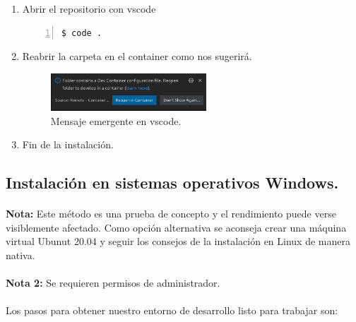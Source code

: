 \begin{enumerate}
    \item Abrir el repositorio con \gls{vscode}
    \begin{lstlisting}[style=consola, numbers=left]
        $ code .
    \end{lstlisting}

    \item Reabrir la carpeta en el container como nos sugerirá.
    \begin{figure}[H]
        \centering
        \includegraphics[width=0.55\textwidth]{imgs/dev-container}
        \caption[Mensaje emergente en vscode]{Mensaje emergente en vscode.}
        \label{imgs:vscode-devcontainer2}
    \end{figure}

    \item Fin de la instalación.
\end{enumerate}

\subsection{Instalación en sistemas operativos Windows.}

\paragraph{}\textbf{Nota:} Este método es una prueba de concepto y el rendimiento puede
verse visiblemente afectado. Como opción alternativa se aconseja crear una máquina
virtual Ubunut 20.04 y seguir los consejos de la instalación en Linux de manera nativa.

\paragraph{}\textbf{Nota 2:} Se requieren permisos de administrador.

\paragraph{}Los pasos para obtener nuestro entorno de desarrollo listo para trabajar son:

